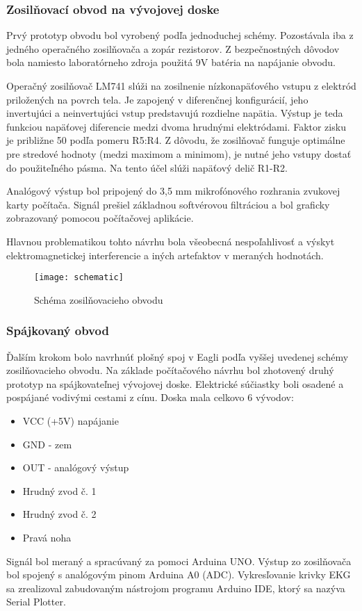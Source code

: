 \documentclass[titlepage]{article}
\begin{document}
\subsubsection{Zosilňovací obvod na vývojovej doske}
Prvý prototyp obvodu bol vyrobený podľa jednoduchej schémy. Pozostávala iba z jedného operačného zosilňovača a zopár rezistorov. Z bezpečnostných dôvodov bola namiesto laboratórneho zdroja použitá 9V batéria na napájanie obvodu. 

Operačný zosilňovač LM741 slúži na zosilnenie nízkonapäťového vstupu z elektród priložených na povrch tela. Je zapojený v diferenčnej konfigurácií, jeho invertujúci a neinvertujúci vstup predstavujú rozdielne napätia. Výstup je teda funkciou napäťovej diferencie medzi dvoma hrudnými elektródami. Faktor zisku je približne 50 podľa pomeru R5:R4. Z dôvodu, že zosilňovač funguje optimálne pre stredové hodnoty (medzi maximom a minimom), je nutné jeho vstupy dostať do použiteľného pásma. Na tento účel slúži napäťový delič R1-R2.

Analógový výstup bol pripojený do 3,5 mm mikrofónového rozhrania zvukovej karty počítača. Signál prešiel základnou softvérovou filtráciou a bol graficky zobrazovaný pomocou počítačovej aplikácie.

Hlavnou problematikou tohto návrhu bola všeobecná nespoľahlivosť a výskyt elektromagnetickej interferencie a iných artefaktov v meraných hodnotách.


\begin{figure}[!ht]
\begin{center}
\texttt{[image: schematic]}
\caption{Schéma zosilňovacieho obvodu}
\end{center}
\end{figure}

\newpage
\subsubsection{Spájkovaný obvod}
Ďalším krokom bolo navrhnúť plošný spoj v Eagli podľa vyššej uvedenej schémy zosilňovacieho obvodu. Na základe počítačového návrhu bol zhotovený druhý prototyp na spájkovateľnej vývojovej doske. Elektrické súčiastky boli osadené a pospájané vodivými cestami z cínu. Doska mala celkovo 6 vývodov:
\begin{itemize}
	\item VCC (+5V) napájanie
	\item GND - zem
	\item OUT - analógový výstup
	\item Hrudný zvod č. 1
	\item Hrudný zvod č. 2
	\item Pravá noha
\end{itemize}
Signál bol meraný a spracúvaný za pomoci Arduina UNO. Výstup zo zosilňovača bol spojený s analógovým pinom Arduina A0 (ADC). Vykresľovanie krivky EKG sa zrealizoval zabudovaným nástrojom programu Arduino IDE, ktorý sa nazýva Serial Plotter.
\end{document}

